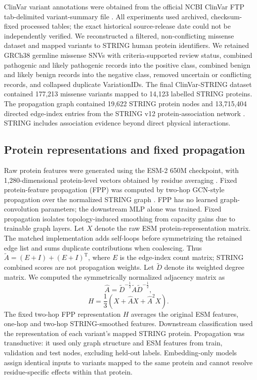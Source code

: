 \documentclass[conference]{IEEEtran}
\begin{document}
ClinVar variant annotations were obtained from the official NCBI ClinVar FTP tab-delimited variant-summary file \cite{Landrum2020ClinVar}. All experiments used archived, checksum-fixed processed tables; the exact historical source-release date could not be independently verified. We reconstructed a filtered, non-conflicting missense dataset and mapped variants to STRING human protein identifiers. We retained GRCh38 germline missense SNVs with criteria-supported review status, combined pathogenic and likely pathogenic records into the positive class, combined benign and likely benign records into the negative class, removed uncertain or conflicting records, and collapsed duplicate VariationIDs. The final ClinVar-STRING dataset contained 177,213 missense variants mapped to 14,123 labelled STRING proteins. The propagation graph contained 19,622 STRING protein nodes and 13,715,404 directed edge-index entries from the STRING v12 protein-association network \cite{Szklarczyk2023STRING}. STRING includes association evidence beyond direct physical interactions.

\subsection{Protein representations and fixed propagation}

Raw protein features were generated using the ESM-2 650M checkpoint, with 1,280-dimensional protein-level vectors obtained by residue averaging \cite{Lin2023ESM}. Fixed protein-feature propagation (FPP) was computed by two-hop GCN-style propagation over the normalized STRING graph \cite{Kipf2017GCN}. FPP has no learned graph-convolution parameters; the downstream MLP alone was trained. Fixed propagation isolates topology-induced smoothing from capacity gains due to trainable graph layers. Let $X$ denote the raw ESM protein-representation matrix. The matched implementation adds self-loops before symmetrizing the retained edge list and sums duplicate contributions when coalescing. Thus $\tilde{A}=(E+I)+(E+I)^{\mathrm{T}}$, where $E$ is the edge-index count matrix; STRING combined scores are not propagation weights. Let $\tilde{D}$ denote its weighted degree matrix. We computed the symmetrically normalized adjacency matrix as
\begin{equation}
\hat{A}=\tilde{D}^{-\frac{1}{2}}\tilde{A}\tilde{D}^{-\frac{1}{2}},
\end{equation}
\begin{equation}
H=\frac{1}{3}\left(X+\hat{A}X+\hat{A}^{2}X\right).
\end{equation}
The fixed two-hop FPP representation $H$ averages the original ESM features, one-hop and two-hop STRING-smoothed features. Downstream classification used the representation of each variant's mapped STRING protein. Propagation was transductive: it used only graph structure and ESM features from train, validation and test nodes, excluding held-out labels. Embedding-only models assign identical inputs to variants mapped to the same protein and cannot resolve residue-specific effects within that protein.
\end{document}
